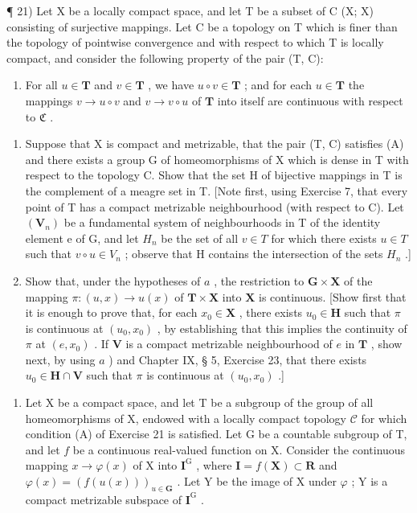 ¶ 21) Let X be a locally compact space, and let T be a subset of C (X; X) consisting of surjective mappings. Let C be a topology on T which is finer than the topology of pointwise convergence and with respect to which T is locally compact, and consider the following property of the pair (T, C):

\begin{enumerate}
\def\labelenumi{(\Alph{enumi})}
\tightlist
\item
  For all \(u \in \mathbf{T}\) and \(v \in \mathbf{T}\) , we have \(u \circ v \in \mathbf{T}\) ; and for each \(u \in \mathbf{T}\) the mappings \(v \to u \circ v\) and \(v \to v \circ u\) of \(\mathbf{T}\) into itself are continuous with respect to \(\mathfrak{C}\) .
\end{enumerate}

\begin{enumerate}
\def\labelenumi{\alph{enumi})}
\item
  Suppose that X is compact and metrizable, that the pair (T, C) satisfies (A) and there exists a group G of homeomorphisms of X which is dense in T with respect to the topology C. Show that the set H of bijective mappings in T is the complement of a meagre set in T. {[}Note first, using Exercise 7, that every point of T has a compact metrizable neighbourhood (with respect to C). Let \((\mathbf{V}_{n})\) be a fundamental system of neighbourhoods in T of the identity element e of G, and let \(H_{n}\) be the set of all \(v \in T\) for which there exists \(u \in T\) such that \(v \circ u \in V_{n}\) ; observe that H contains the intersection of the sets \(H_{n}\) .{]}
\item
  Show that, under the hypotheses of \(a\) , the restriction to \(\mathbf{G} \times \mathbf{X}\) of the mapping \(\pi: (u, x) \to u(x)\) of \(\mathbf{T} \times \mathbf{X}\) into \(\mathbf{X}\) is continuous. {[}Show first that it is enough to prove that, for each \(x_0 \in \mathbf{X}\) , there exists \(u_0 \in \mathbf{H}\) such that \(\pi\) is continuous at \((u_0, x_0)\) , by establishing that this implies the continuity of \(\pi\) at \((e, x_0)\) . If \(\mathbf{V}\) is a compact metrizable neighbourhood of \(e\) in \(\mathbf{T}\) , show next, by using \(a\) ) and Chapter IX, § 5, Exercise 23, that there exists \(u_0 \in \mathbf{H} \cap \mathbf{V}\) such that \(\pi\) is continuous at \((u_0, x_0)\) .{]}
\end{enumerate}

\begin{enumerate}
\def\labelenumi{\arabic{enumi})}
\setcounter{enumi}{21}
\tightlist
\item
  Let X be a compact space, and let T be a subgroup of the group of all homeomorphisms of X, endowed with a locally compact topology \(\mathcal{C}\) for which condition (A) of Exercise 21 is satisfied. Let G be a countable subgroup of T, and let \(f\) be a continuous real-valued function on X. Consider the continuous mapping \(x \to \varphi(x)\) of X into \(\mathbf{I}^{\mathrm{G}}\) , where \(\mathbf{I} = f(\mathbf{X}) \subset \mathbf{R}\) and \(\varphi(x) = (f(u(x)))_{u \in \mathbf{G}}\) . Let Y be the image of X under \(\varphi\) ; Y is a compact metrizable subspace of \(\mathbf{I}^{\mathrm{G}}\) .
\end{enumerate}

